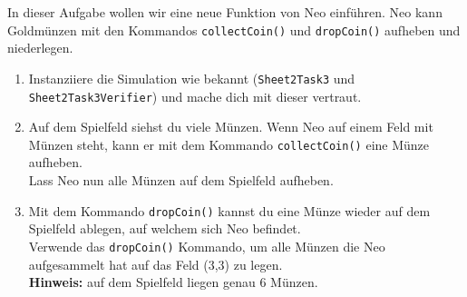 

In dieser Aufgabe wollen wir eine neue Funktion von Neo einführen.
Neo kann Goldmünzen mit den Kommandos \lstinline{collectCoin()} und \lstinline{dropCoin()} aufheben und niederlegen.

\begin{enumerate}
\item Instanziiere die Simulation wie bekannt (\lstinline{Sheet2Task3} und \lstinline{Sheet2Task3Verifier}) und mache dich mit dieser vertraut.
\item Auf dem Spielfeld siehst du viele Münzen.
Wenn Neo auf einem Feld mit Münzen steht, kann er mit dem Kommando \lstinline{collectCoin()} eine Münze aufheben.\\
Lass Neo nun alle Münzen auf dem Spielfeld aufheben.
\item Mit dem Kommando \lstinline{dropCoin()} kannst du eine Münze wieder auf dem Spielfeld ablegen, auf welchem sich Neo befindet.\\
Verwende das \lstinline{dropCoin()} Kommando, um alle Münzen die Neo aufgesammelt hat auf das Feld (3,3) zu legen.\\
\textbf{Hinweis:} auf dem Spielfeld liegen genau 6 Münzen.
\end{enumerate}


